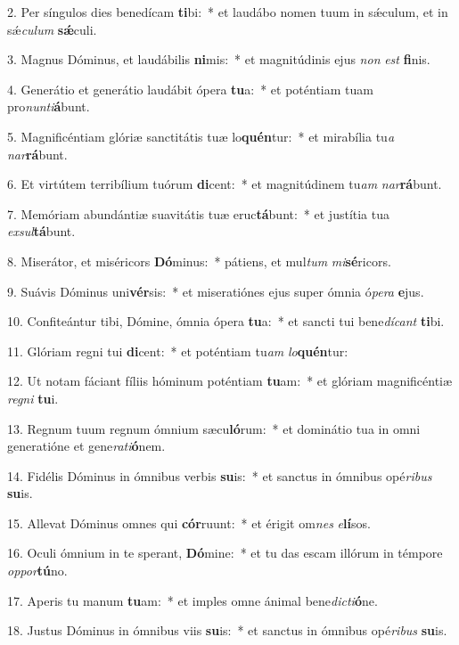 2. Per síngulos dies benedícam \textbf{ti}bi:~*  et laudábo nomen tuum in sǽculum, et in sǽ\textit{cu}\textit{lum} \textbf{sǽ}culi.\

3. Magnus Dóminus, et laudábilis \textbf{ni}mis:~*  et magnitúdinis ejus \textit{non} \textit{est} \textbf{fi}nis.\

4. Generátio et generátio laudábit ópera \textbf{tu}a:~*  et poténtiam tuam pro\textit{nun}\textit{ti}\textbf{á}bunt.\

5. Magnificéntiam glóriæ sanctitátis tuæ lo\textbf{quén}tur:~*  et mirabília tu\textit{a} \textit{nar}\textbf{rá}bunt.\

6. Et virtútem terribílium tuórum \textbf{di}cent:~*  et magnitúdinem tu\textit{am} \textit{nar}\textbf{rá}bunt.\

7. Memóriam abundántiæ suavitátis tuæ eruc\textbf{tá}bunt:~*  et justítia tua \textit{ex}\textit{sul}\textbf{tá}bunt.\

8. Miserátor, et miséricors \textbf{Dó}minus:~*  pátiens, et mul\textit{tum} \textit{mi}\textbf{sé}ricors.\

9. Suávis Dóminus uni\textbf{vér}sis:~*  et miseratiónes ejus super ómnia ó\textit{pe}\textit{ra} \textbf{e}jus.\

10. Confiteántur tibi, Dómine, ómnia ópera \textbf{tu}a:~*  et sancti tui bene\textit{dí}\textit{cant} \textbf{ti}bi.\

11. Glóriam regni tui \textbf{di}cent:~*  et poténtiam tu\textit{am} \textit{lo}\textbf{quén}tur:\

12. Ut notam fáciant fíliis hóminum poténtiam \textbf{tu}am:~*  et glóriam magnificéntiæ \textit{re}\textit{gni} \textbf{tu}i.\

13. Regnum tuum regnum ómnium sæcu\textbf{ló}rum:~*  et dominátio tua in omni generatióne et gene\textit{ra}\textit{ti}\textbf{ó}nem.\

14. Fidélis Dóminus in ómnibus verbis \textbf{su}is:~*  et sanctus in ómnibus opé\textit{ri}\textit{bus} \textbf{su}is.\

15. Allevat Dóminus omnes qui \textbf{cór}ruunt:~*  et érigit om\textit{nes} \textit{e}\textbf{lí}sos.\

16. Oculi ómnium in te sperant, \textbf{Dó}mine:~*  et tu das escam illórum in témpore \textit{op}\textit{por}\textbf{tú}no.\

17. Aperis tu manum \textbf{tu}am:~*  et imples omne ánimal bene\textit{dic}\textit{ti}\textbf{ó}ne.\

18. Justus Dóminus in ómnibus viis \textbf{su}is:~*  et sanctus in ómnibus opé\textit{ri}\textit{bus} \textbf{su}is.\

